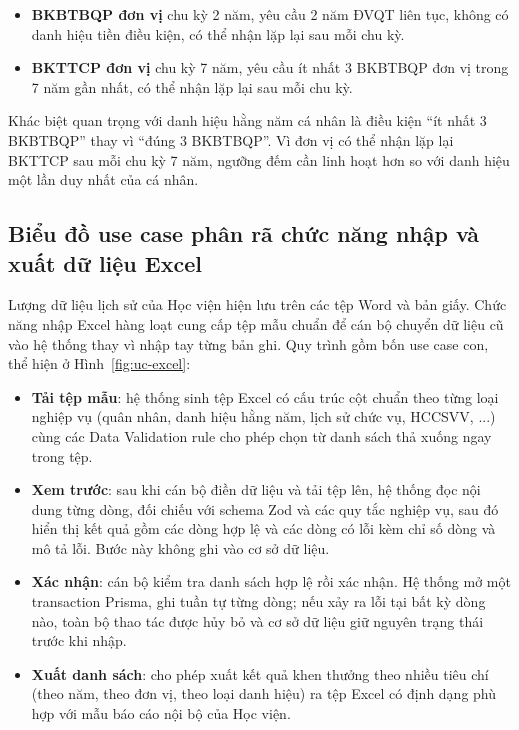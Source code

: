 \documentclass[../DoAn.tex]{subfiles}
\begin{document}
\begin{itemize}
    \item \textbf{BKBTBQP đơn vị} chu kỳ 2 năm, yêu cầu 2 năm ĐVQT liên tục, không có danh hiệu tiền điều kiện, có thể nhận lặp lại sau mỗi chu kỳ.
    \item \textbf{BKTTCP đơn vị} chu kỳ 7 năm, yêu cầu ít nhất 3 BKBTBQP đơn vị trong 7 năm gần nhất, có thể nhận lặp lại sau mỗi chu kỳ.
\end{itemize}

Khác biệt quan trọng với danh hiệu hằng năm cá nhân là điều kiện ``ít nhất 3 BKBTBQP'' thay vì ``đúng 3 BKBTBQP''. Vì đơn vị có thể nhận lặp lại BKTTCP sau mỗi chu kỳ 7 năm, ngưỡng đếm cần linh hoạt hơn so với danh hiệu một lần duy nhất của cá nhân.

\subsection{Biểu đồ use case phân rã chức năng nhập và xuất dữ liệu Excel}
\label{subsection:2.2.7}

Lượng dữ liệu lịch sử của Học viện hiện lưu trên các tệp Word và bản giấy. Chức năng nhập Excel hàng loạt cung cấp tệp mẫu chuẩn để cán bộ chuyển dữ liệu cũ vào hệ thống thay vì nhập tay từng bản ghi. Quy trình gồm bốn use case con, thể hiện ở Hình~\ref{fig:uc-excel}:

\begin{itemize}
    \item \textbf{Tải tệp mẫu}: hệ thống sinh tệp Excel có cấu trúc cột chuẩn theo từng loại nghiệp vụ (quân nhân, danh hiệu hằng năm, lịch sử chức vụ, HCCSVV, ...) cùng các Data Validation rule cho phép chọn từ danh sách thả xuống ngay trong tệp.
    \item \textbf{Xem trước}: sau khi cán bộ điền dữ liệu và tải tệp lên, hệ thống đọc nội dung từng dòng, đối chiếu với schema Zod và các quy tắc nghiệp vụ, sau đó hiển thị kết quả gồm các dòng hợp lệ và các dòng có lỗi kèm chỉ số dòng và mô tả lỗi. Bước này không ghi vào cơ sở dữ liệu.
    \item \textbf{Xác nhận}: cán bộ kiểm tra danh sách hợp lệ rồi xác nhận. Hệ thống mở một transaction Prisma, ghi tuần tự từng dòng; nếu xảy ra lỗi tại bất kỳ dòng nào, toàn bộ thao tác được hủy bỏ và cơ sở dữ liệu giữ nguyên trạng thái trước khi nhập.
    \item \textbf{Xuất danh sách}: cho phép xuất kết quả khen thưởng theo nhiều tiêu chí (theo năm, theo đơn vị, theo loại danh hiệu) ra tệp Excel có định dạng phù hợp với mẫu báo cáo nội bộ của Học viện.
\end{itemize}
\end{document}
